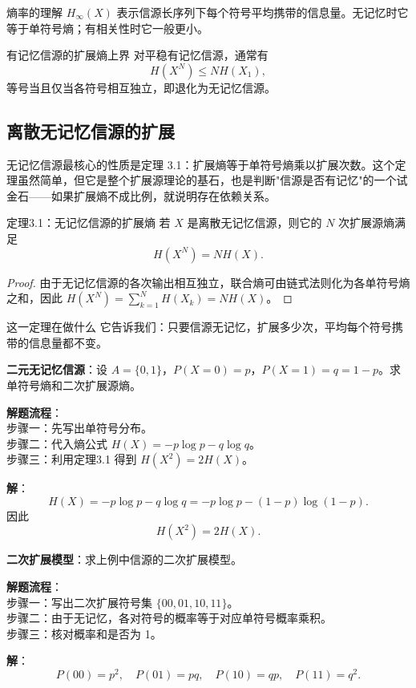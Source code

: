 \begin{formulaBox}{熵率的理解}
$H_\infty(X)$ 表示信源长序列下每个符号平均携带的信息量。无记忆时它等于单符号熵；有相关性时它一般更小。
\end{formulaBox}

\begin{formulaBox}{有记忆信源的扩展熵上界}
对平稳有记忆信源，通常有
\[
 H(X^N)\le N H(X_1),
\]
等号当且仅当各符号相互独立，即退化为无记忆信源。
\end{formulaBox}

\subsection{离散无记忆信源的扩展}

无记忆信源最核心的性质是定理 3.1：扩展熵等于单符号熵乘以扩展次数。这个定理虽然简单，但它是整个扩展源理论的基石，也是判断"信源是否有记忆"的一个试金石——如果扩展熵不成比例，就说明存在依赖关系。

\begin{theoremBox}{定理3.1：无记忆信源的扩展熵}
若 $X$ 是离散无记忆信源，则它的 $N$ 次扩展源熵满足
\[
 H(X^N)=N H(X).
\]
\end{theoremBox}

\begin{proof}
由于无记忆信源的各次输出相互独立，联合熵可由链式法则化为各单符号熵之和，因此 $H(X^N)=\sum_{k=1}^N H(X_k)=N H(X)$。
\end{proof}

\begin{keypoint}{这一定理在做什么}
它告诉我们：只要信源无记忆，扩展多少次，平均每个符号携带的信息量都不变。
\end{keypoint}

\begin{example}
\label{ex:binary-memoryless}
\textbf{二元无记忆信源}：设 $A=\{0,1\}$，$P(X=0)=p$，$P(X=1)=q=1-p$。求单符号熵和二次扩展源熵。

\noindent \textbf{解题流程}：\\[2pt]
步骤一：先写出单符号分布。\\
步骤二：代入熵公式 $H(X)=-p\log p-q\log q$。\\
步骤三：利用定理3.1 得到 $H(X^2)=2H(X)$。

\textbf{解}：
\[
H(X)=-p\log p-q\log q=-p\log p-(1-p)\log(1-p).
\]
因此
\[
H(X^2)=2H(X).
\]
\end{example}

\begin{example}
\label{ex:ch3-second-extension-model}
\textbf{二次扩展模型}：求上例中信源的二次扩展模型。

\noindent \textbf{解题流程}：\\[2pt]
步骤一：写出二次扩展符号集 $\{00,01,10,11\}$。\\
步骤二：由于无记忆，各对符号的概率等于对应单符号概率乘积。\\
步骤三：核对概率和是否为 1。

\textbf{解}：
\[
P(00)=p^2,\quad P(01)=pq,\quad P(10)=qp,\quad P(11)=q^2.
\]
\end{example}

